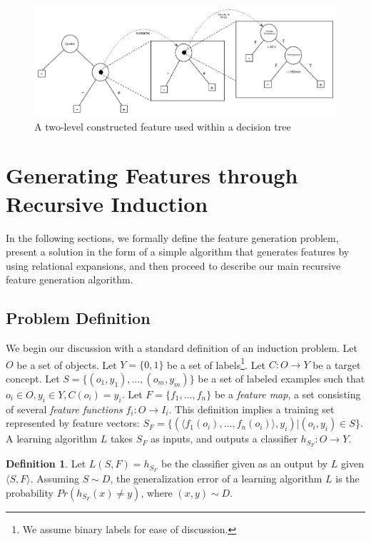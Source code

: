 \documentclass[twoside,11pt]{article}
\theoremstyle{definition}
\newtheorem{defn}{Definition}[section]
\begin{document}
\begin{figure}[th]
	\centering
	\includegraphics[width=\linewidth]{fig3.pdf}
	\caption{A two-level constructed feature used within a decision tree}
	\label{fig:lvl2_tree}
\end{figure}



\section{Generating Features through Recursive Induction} \label{formal}

In the following sections, we formally define the feature generation problem, present a solution  in the form of a simple algorithm that generates features by using
relational expansions, and then proceed to describe our main recursive feature generation algorithm.

\subsection{Problem Definition}

We begin our discussion with a standard definition of an induction problem. 
Let $O$ be a set of objects. Let $Y=\{0,1\}$ be a set of labels\footnote{We assume binary labels for ease of discussion.}. Let $C:O\rightarrow Y$ be a target concept. Let $S=\{(o_{1},y_{1}),\ldots,(o_{m},y_{m})\}$ be a set of labeled examples such that $o_{i}\in O, y_{i}\in Y, C(o_i)=y_i$. 
Let $F=\{f_{1},\ldots,f_{n}\}$ be a \emph{feature map}, a set consisting of several \emph{feature functions} $f_{i}:O\rightarrow I_{i}$.  This definition implies a training set represented by feature vectors: $S_F=\{ (\langle f_1(o_i),\ldots,f_n(o_i)\rangle, y_i) | (o_i,y_i) \in S\}$. A learning algorithm $L$ takes $S_F$ as inputs, and outputs a classifier $h_{S_F}:O\rightarrow Y$.
\begin{defn}
	Let $L(S,F)=h_{S_F}$ be the classifier given as an output by $L$ given $\langle S,F\rangle$. Assuming $S\sim D$, the generalization error of a learning algorithm $L$ is the probability $Pr(h_{S_F}(x)\neq y)$, where $(x,y)\sim D$.
\end{defn}
\end{document}

